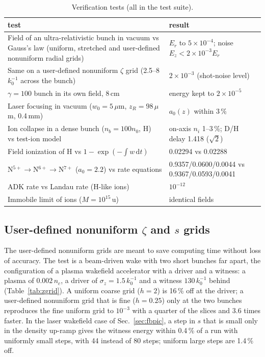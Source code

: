 \documentclass[preprint,12pt]{elsarticle}
\newcommand{\dd}{\mathrm{d}}
\begin{document}
\begin{table}[!htbp]
\caption{Verification tests (all in the test suite).}\label{tab:tests}
\begin{tabular}{p{}p{}}
\toprule
test & result \\ \midrule
Field of an ultra-relativistic bunch in vacuum vs Gauss's law (uniform, stretched and user-defined nonuniform radial grids) & $E_r$ to $5\times10^{-4}$; noise $E_z < 2\times10^{-3}E_r$ \\
Same on a user-defined nonuniform $\zeta$ grid (2.5--8\,$k_0^{-1}$ across the bunch) & $2\times10^{-3}$ (shot-noise level) \\
$\gamma = 100$ bunch in its own field, 8\,cm & energy kept to $2\times10^{-5}$ \\
Laser focusing in vacuum ($w_0 = 5\,\mu$m, $z_R = 98\,\mu$m, 0.4\,mm) & $a_0(z)$ within 3\,\% \\
Ion collapse in a dense bunch ($n_b = 100 n_0$, H)~\cite{Rosenzweig2005} vs test-ion model & on-axis $n_i$ 1--3\,\%; D/H delay 1.418 ($\sqrt2$) \\
Field ionization of H vs $1 - \exp(-\int w\,\dd t)$ & 0.02294 vs 0.02288 \\
N$^{5+}\to$N$^{6+}\to$N$^{7+}$ ($a_0 = 2.2$) vs rate equations & 0.9357/0.0600/0.0044 vs 0.9367/0.0593/0.0041 \\
ADK rate vs Landau rate (H-like ions) & $10^{-12}$ \\
Immobile limit of ions ($M = 10^{15}$\,u) & identical fields \\
\bottomrule
\end{tabular}
\end{table}

\subsection{User-defined nonuniform $\zeta$ and $s$ grids}

The user-defined nonuniform grids are meant to save computing time without loss of accuracy. The test is a beam-driven wake with two short bunches far apart, the configuration of a plasma wakefield accelerator with a driver and a witness: a plasma of $0.002\,n_c$, a driver of $\sigma_z = 1.5\,k_0^{-1}$ and a witness $130\,k_0^{-1}$ behind (Table~\ref{tab:zgrid}). A uniform coarse grid ($h = 2$) is 16\,\% off at the driver; a user-defined nonuniform grid that is fine ($h = 0.25$) only at the two bunches reproduces the fine uniform grid to $10^{-3}$ with a quarter of the slices and 3.6 times faster. In the laser wakefield case of Sec.~\ref{sec:fbpic}, a step in $s$ that is small only in the density up-ramp gives the witness energy within 0.4\,\% of a run with uniformly small steps, with 44 instead of 80 steps; uniform large steps are 1.4\,\% off.
\end{document}
